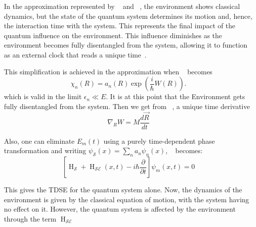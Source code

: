 In the approximation represented by ~ and
~, the environment shows classical dynamics, but
the state of the quantum system determines its motion and, hence, the interaction time with the system. This represents the final impact of the quantum influence on the environment. This influence diminishes as the environment becomes fully disentangled
from the system, allowing it to function as an external clock that reads a unique time~\cite{briggs2001derivation}.

This simplification is achieved in the approximation when ~ becomes
\begin{equation}
    \label{eqn:chap2_clc_action2}
    \chi_n(R) = a_n(R) \exp\left(\frac{i}{\hbar} W(R)\right).
\end{equation}
which is valid  in the limit \(\epsilon_n \ll E\). It is at this point that the Environment gets fully disentangled from the system. Then we get from ~, a unique time derivative
\begin{equation}
    \label{eqn:chap2_clc_action3}
    \nabla_R W = M \dfrac{d \vec{R}}{dt}
\end{equation}

Also, one can eliminate \(E_m(t)\) using a purely time-dependent phase transformation and writing 
\(\psi_{\mathcal{S}}(x) = \sum_{n}a_n \psi_n(x)\), ~ becomes:
\begin{equation}
    \label{eqn:chap2_system_evol_mod4}
     \left[
    \operatorname{H}_{\mathcal{S}} + \operatorname{H}_{\mathcal{SE}}(x, t)- i \hbar \dfrac{\partial}{\partial t} \right] 
    \psi_m (x,t)= 0
\end{equation}

This gives the TDSE for the quantum system alone. Now, the dynamics of the environment is given by the classical equation of motion, with the system having no effect on it. However, the quantum system is affected by the environment
through the term \(\operatorname{H}_{\mathcal{SE}}\)

\newpage